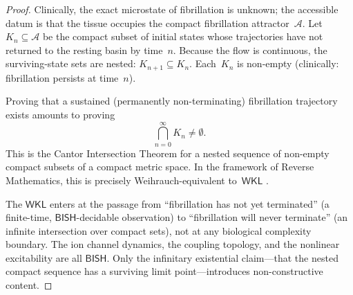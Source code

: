 \documentclass[11pt,a4paper]{article}
\theoremstyle{plain}
\theoremstyle{definition}
\newcommand{\BISH}{\textsf{BISH}}
\newcommand{\WKL}{\textsf{WKL}}
\begin{document}
\begin{proof}
Clinically, the exact microstate of fibrillation is unknown; the accessible datum is that the tissue occupies the compact fibrillation attractor~$\mathcal{A}$.  Let $K_n \subseteq \mathcal{A}$ be the compact subset of initial states whose trajectories have not returned to the resting basin by time~$n$.  Because the flow is continuous, the surviving-state sets are nested: $K_{n+1} \subseteq K_n$.  Each~$K_n$ is non-empty (clinically: fibrillation persists at time~$n$).

Proving that a sustained (permanently non-terminating) fibrillation trajectory exists amounts to proving
\[
  \bigcap_{n=0}^{\infty} K_n \neq \emptyset.
\]
This is the Cantor Intersection Theorem for a nested sequence of non-empty compact subsets of a compact metric space.  In the framework of Reverse Mathematics, this is precisely Weihrauch-equivalent to~$\WKL$ \cite{brattka2024}.

The $\WKL$ enters at the passage from ``fibrillation has not yet terminated'' (a finite-time, $\BISH$-decidable observation) to ``fibrillation will never terminate'' (an infinite intersection over compact sets), not at any biological complexity boundary.  The ion channel dynamics, the coupling topology, and the nonlinear excitability are all $\BISH$.  Only the infinitary existential claim---that the nested compact sequence has a surviving limit point---introduces non-constructive content.
\end{proof}
\end{document}
